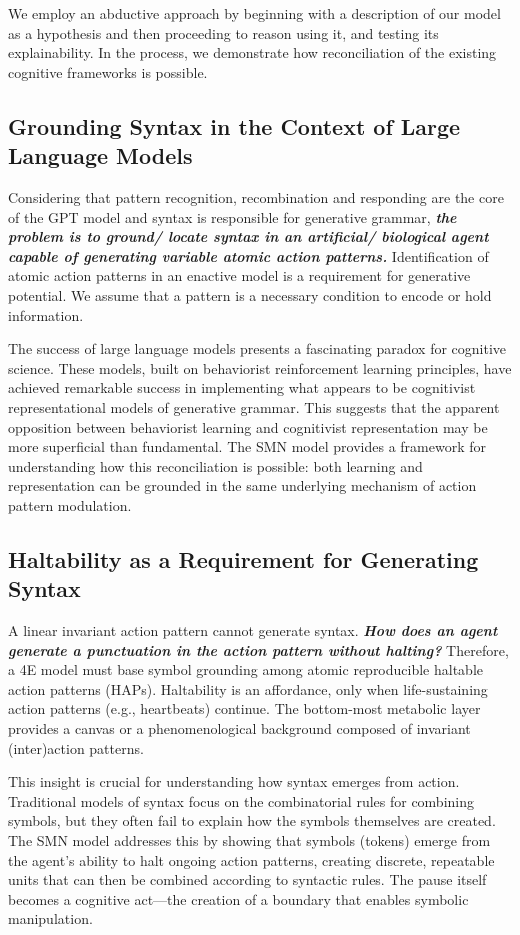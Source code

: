 We employ an abductive approach by beginning with a description of our model as a hypothesis and then proceeding to reason using it, and testing its explainability. In the process, we demonstrate how reconciliation of the existing cognitive frameworks is possible.

\subsection{Grounding Syntax in the Context of Large Language Models}
Considering that pattern recognition, recombination and responding are the core of the GPT model and syntax is responsible for generative grammar, \textbf{\textit{the problem is to ground/ locate syntax in an artificial/ biological agent capable of generating variable atomic action patterns.}} Identification of atomic action patterns in an enactive model is a requirement for generative potential. We assume that a pattern is a necessary condition to encode or hold information.

The success of large language models presents a fascinating paradox for cognitive science. These models, built on behaviorist reinforcement learning principles, have achieved remarkable success in implementing what appears to be cognitivist representational models of generative grammar. This suggests that the apparent opposition between behaviorist learning and cognitivist representation may be more superficial than fundamental. The SMN model provides a framework for understanding how this reconciliation is possible: both learning and representation can be grounded in the same underlying mechanism of action pattern modulation. 

\subsection{Haltability as a Requirement for Generating Syntax}
A linear invariant action pattern cannot generate syntax. \textbf{\textit{How does an agent generate a punctuation in the action pattern without halting?}} Therefore, a 4E model must base symbol grounding among atomic reproducible haltable action patterns (HAPs). Haltability is an affordance, only when life-sustaining action patterns (e.g., heartbeats) continue. The bottom-most metabolic layer provides a canvas or a phenomenological background composed of invariant (inter)action patterns.

This insight is crucial for understanding how syntax emerges from action. Traditional models of syntax focus on the combinatorial rules for combining symbols, but they often fail to explain how the symbols themselves are created. The SMN model addresses this by showing that symbols (tokens) emerge from the agent's ability to halt ongoing action patterns, creating discrete, repeatable units that can then be combined according to syntactic rules. The pause itself becomes a cognitive act—the creation of a boundary that enables symbolic manipulation.

